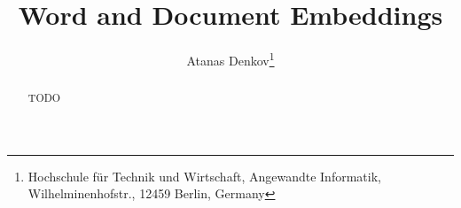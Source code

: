 \documentclass[english]{lni}
\begin{document}
\title[Word and Document Embeddings]{Word and Document Embeddings}
\author[Atanas Denkov]
{Atanas Denkov\footnote{Hochschule für Technik und Wirtschaft, Angewandte Informatik, Wilhelminenhofstr., 12459 Berlin,
Germany }}

\maketitle

\begin{abstract}
TODO
\end{abstract}
    

\clearpage
\end{document}
